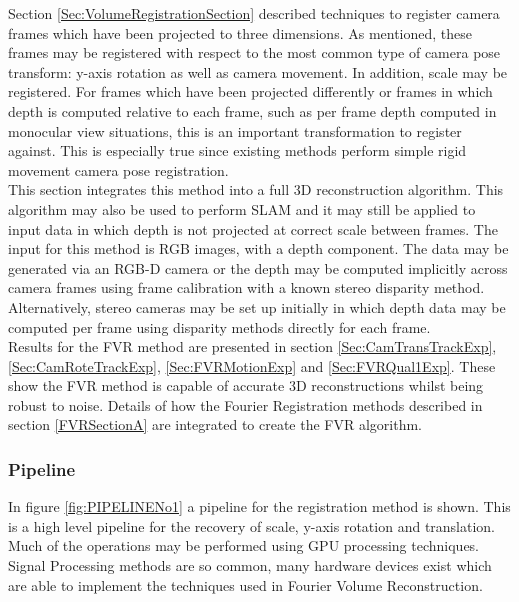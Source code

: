 
Section \ref{Sec:VolumeRegistrationSection} described techniques to register camera frames which have been projected to three dimensions. As mentioned, these frames may be registered with respect to the most common type of camera pose transform: y-axis rotation as well as camera movement. In addition, scale may be registered. For frames which have been projected differently or frames in which depth is computed relative to each frame, such as per frame depth computed in monocular view situations, this is an important transformation to register against. This is especially true since existing methods perform simple rigid movement camera pose registration. \\

This section integrates this method into a full 3D reconstruction algorithm. This algorithm may also be used to perform SLAM and it may still be applied to input data in which depth is not projected at correct scale between frames. The input for this method is RGB images, with a depth component. The data may be generated via an RGB-D camera or the depth may be computed implicitly across camera frames using frame calibration with a known stereo disparity method. Alternatively, stereo cameras may be set up initially in which depth data may be computed per frame using disparity methods directly for each frame. \\

Results for the FVR method are presented in section \ref{Sec:CamTransTrackExp}, \ref{Sec:CamRoteTrackExp}, \ref{Sec:FVRMotionExp} and \ref{Sec:FVRQual1Exp}. These show the FVR method is capable of accurate 3D reconstructions whilst being robust to noise. Details of how the Fourier Registration methods described in section \ref{FVRSectionA} are integrated to create the FVR algorithm. \\


\subsubsection{Pipeline}

\label{sec:FVRPipelineSect}

In figure \ref{fig:PIPELINENo1} a pipeline for the registration method is shown. This is a high level pipeline for the recovery of scale, y-axis rotation and translation. Much of the operations may be performed using GPU processing techniques. Signal Processing methods are so common, many hardware devices exist which are able to implement the techniques used in Fourier Volume Reconstruction. \\

